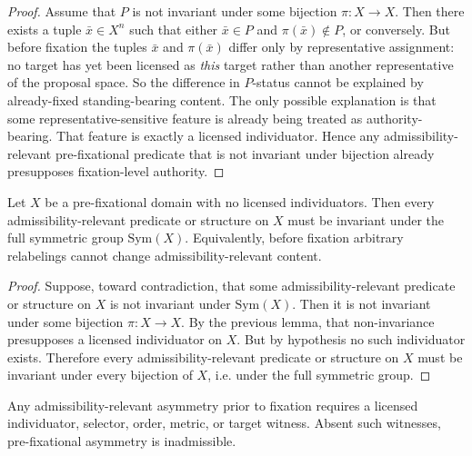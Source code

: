 \begin{proof}
Assume that $P$ is not invariant under some bijection $\pi:X\to X$. Then there exists a tuple $\bar x\in X^n$ such that either $\bar x\in P$ and $\pi(\bar x)\notin P$, or conversely. But before fixation the tuples $\bar x$ and $\pi(\bar x)$ differ only by representative assignment: no target has yet been licensed as \emph{this} target rather than another representative of the proposal space. So the difference in $P$-status cannot be explained by already-fixed standing-bearing content. The only possible explanation is that some representative-sensitive feature is already being treated as authority-bearing. That feature is exactly a licensed individuator. Hence any admissibility-relevant pre-fixational predicate that is not invariant under bijection already presupposes fixation-level authority.\cite{MaleyAMetric,MaleyNecessity}
\end{proof}

\begin{theorem}
\label{thm:relabeling-indifference}
Let $X$ be a pre-fixational domain with no licensed individuators. Then every admissibility-relevant predicate or structure on $X$ must be invariant under the full symmetric group $\mathrm{Sym}(X)$. Equivalently, before fixation arbitrary relabelings cannot change admissibility-relevant content.
\end{theorem}

\begin{proof}
Suppose, toward contradiction, that some admissibility-relevant predicate or structure on $X$ is not invariant under $\mathrm{Sym}(X)$. Then it is not invariant under some bijection $\pi:X\to X$. By the previous lemma, that non-invariance presupposes a licensed individuator on $X$. But by hypothesis no such individuator exists. Therefore every admissibility-relevant predicate or structure on $X$ must be invariant under every bijection of $X$, i.e. under the full symmetric group.\cite{MaleyAMetric,MaleyNecessity}
\end{proof}

\begin{corollary}
Any admissibility-relevant asymmetry prior to fixation requires a licensed individuator, selector, order, metric, or target witness. Absent such witnesses, pre-fixational asymmetry is inadmissible.
\end{corollary}


